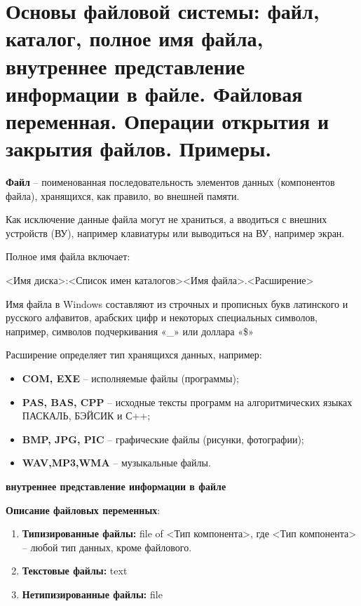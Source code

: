 
\newpage\section{Основы файловой системы: файл, каталог, полное имя файла, внутреннее представление 
информации в файле. Файловая переменная. Операции открытия и закрытия файлов. Примеры. }

\begin{myquote}
            
\end{myquote}

{\bf Файл} – поименованная  последовательность элементов данных (компонентов файла), хранящихся, как правило, во внешней памяти. 

Как исключение данные файла могут не храниться, а вводиться с внешних устройств (ВУ), например клавиатуры или выводиться на ВУ, например экран.

Полное имя файла включает:

<Имя диска>:<Список имен каталогов><Имя файла>.<Расширение>

Имя файла в Windows составляют из строчных и прописных букв латинского и русского алфавитов, арабских цифр и некоторых специальных символов, например, символов подчеркивания «\_» или доллара «\$»

Расширение определяет тип хранящихся данных, например:

\begin{itemize}
	\item {\bf COM, EXE} – исполняемые файлы (программы);
	\item {\bf PAS, BAS, CPP} – исходные тексты программ на алгоритмических языках  ПАСКАЛЬ, БЭЙСИК и С++;
	\item {\bf BMP, JPG, PIC} – графические файлы (рисунки, фотографии); 
	\item {\bf WAV,MP3,WMA} – музыкальные файлы.
\end{itemize}

{\bf {внутреннее представление информации в файле}}


{\bf {Описание файловых переменных}}:

\begin{enumerate}
\item {\bf Типизированные файлы:}  	     file of <Тип компонента>,
    где  <Тип компонента> – любой тип данных, кроме файлового.
\item {\bf Текстовые файлы:}     text
\item {\bf Нетипизированные файлы:}   file
\end{enumerate}

